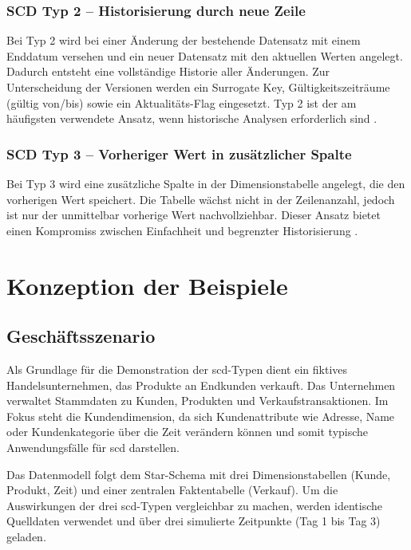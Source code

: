 \documentclass[a4paper,11pt]{article}
\begin{document}
\subsubsection{SCD Typ 2 -- Historisierung durch neue Zeile}
Bei Typ 2 wird bei einer Änderung der bestehende Datensatz mit einem Enddatum versehen und ein 
neuer Datensatz mit den aktuellen Werten angelegt. Dadurch entsteht eine vollständige Historie aller 
Änderungen. Zur Unterscheidung der Versionen werden ein Surrogate Key, Gültigkeitszeiträume (gültig von/bis) 
sowie ein Aktualitäts-Flag eingesetzt. Typ 2 ist der am häufigsten verwendete Ansatz, wenn historische Analysen 
erforderlich sind \parencite[S.~181]{linstedt2015data}.

\subsubsection{SCD Typ 3 -- Vorheriger Wert in zusätzlicher Spalte}
Bei Typ 3 wird eine zusätzliche Spalte in der Dimensionstabelle angelegt, die den vorherigen Wert 
speichert. Die Tabelle wächst nicht in der Zeilenanzahl, jedoch ist nur der unmittelbar vorherige Wert 
nachvollziehbar. Dieser Ansatz bietet einen Kompromiss zwischen Einfachheit und begrenzter Historisierung \parencite[S.~182]{linstedt2015data}.

\section{Konzeption der Beispiele}

\subsection{Geschäftsszenario}
Als Grundlage für die Demonstration der \gls{scd}-Typen dient ein fiktives Handelsunternehmen, das Produkte an 
Endkunden verkauft. Das Unternehmen verwaltet Stammdaten zu Kunden, Produkten und Verkaufstransaktionen. 
Im Fokus steht die Kundendimension, da sich Kundenattribute wie Adresse, Name oder Kundenkategorie über die Zeit 
verändern können und somit typische Anwendungsfälle für \gls{scd} darstellen.

Das Datenmodell folgt dem Star-Schema mit drei Dimensionstabellen (Kunde, Produkt, Zeit) und einer zentralen 
Faktentabelle (Verkauf). Um die Auswirkungen der drei \gls{scd}-Typen vergleichbar zu machen, werden identische 
Quelldaten verwendet und über drei simulierte Zeitpunkte (Tag 1 bis Tag 3) geladen.
\end{document}
